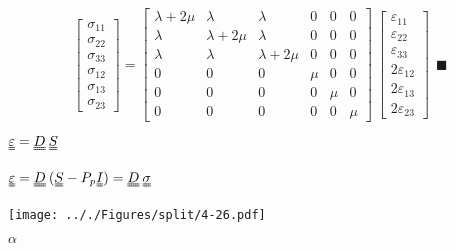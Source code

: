 \documentclass[onecolumn,11pt]{report}
\def\lthtmlcheckvsize{\ifdim\ht\sizebox<\vsize 
  \ifdim\wd\sizebox<\hsize\expandafter\hfill\fi \expandafter\vfill
  \else\expandafter\vss\fi}%
\begin{document}
{\newpage\clearpage
{}%
\begin{displaymath}%
	\left[
\begin{array} {c}
\sigma_{11} \\
\sigma_{22} \\
\sigma_{33} \\
\sigma_{12} \\
\sigma_{13} \\
\sigma_{23}
\end{array}
\right]
=
\left[
\begin{array}{cccccc}
\lambda + 2\mu & \lambda & \lambda & 0 & 0 & 0\\
\lambda & \lambda + 2 \mu & \lambda & 0 & 0 & 0\\
\lambda & \lambda & \lambda + 2 \mu & 0 & 0 & 0\\
0 & 0 & 0 & \mu & 0 & 0 \\
0 & 0 & 0 & 0 & \mu & 0 \\
0 & 0 & 0 & 0 & 0 & \mu
\end{array}
\right]
\:
\left[
\begin{array} {c}
\varepsilon_{11} \\
\varepsilon_{22} \\
\varepsilon_{33} \\
2 \varepsilon_{12} \\
2 \varepsilon_{13} \\
2 \varepsilon_{23}
\end{array}
\right] \: \: \blacksquare\end{displaymath}%
\lthtmldisplayZ
\lthtmlcheckvsize\clearpage}

{\newpage\clearpage
{}%
$ \uuline{\varepsilon} = \uuline{D} \: \uuline{S}$%
\lthtmlindisplaymathZ
\lthtmlcheckvsize\clearpage}

{\newpage\clearpage
{}%
$\displaystyle \uuline{\varepsilon} = \uuline{D} \: (\uuline{S} - P_p \uuline{I})  = \uuline{D} \: \uuline{\sigma}$%
\lthtmlindisplaymathZ
\lthtmlcheckvsize\clearpage}

{\newpage\clearpage
{}%
\texttt{[image: .././Figures/split/4-26.pdf]}%
\lthtmlpictureZ
\lthtmlcheckvsize\clearpage}

{\newpage\clearpage
{}%
$ \alpha$%
\lthtmlindisplaymathZ
\lthtmlcheckvsize\clearpage}
\end{document}

